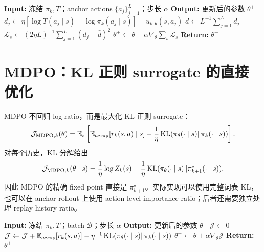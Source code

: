 \begin{algorithm}
\caption{BPO inner update\\{\small\textit{Semantics: 根据当前 student 的中心化 score 重构}}}
\begin{algorithmic}
\STATE \textbf{Input:} 冻结 $\pi_k,T$；anchor actions $\{a_j\}_{j=1}^{L}$；步长 $\alpha$
\STATE \textbf{Output:} 更新后的参数 $\theta^+$
        \STATE $d_j\gets\eta[\log T(a_j\mid s)-\log\pi_k(a_j\mid s)]-u_{k,\theta}(s,a_j)$
    \ENDFOR
    \STATE $\bar d\gets L^{-1}\sum_{j=1}^{L}d_j$
    \STATE $\mathcal L_s\gets(2\eta L)^{-1}\sum_{j=1}^{L}(d_j-\bar d)^2$
\ENDFOR
\STATE $\theta^+\gets\theta-\alpha\nabla_\theta\sum_s\mathcal L_s$
\STATE \textbf{Return:} $\theta^+$
\end{algorithmic}
\end{algorithm}

\section{MDPO：KL 正则 surrogate 的直接优化}
\label{sec:mdpo-unified}

MDPO 不回归 log-ratio，而是最大化 KL 正则 surrogate：
\begin{equation}
\label{eq:mdpo-objective}
 \mathcal J_{\mathrm{MDPO},k}(\theta)
 =\mathbb{E}_{s}\left[
 \mathbb{E}_{a\sim\pi_\theta}[r_k(s,a)\mid s]
 -\frac1\eta\operatorname{KL}(\pi_\theta(\cdot\mid s)\Vert\pi_k(\cdot\mid s))
 \right].
\end{equation}
对每个历史，KL 分解给出
\begin{equation}
\label{eq:mdpo-kl-decomposition}
 \mathcal J_{\mathrm{MDPO},k}(\theta\mid s)
 =\frac1\eta\log Z_k(s)
 -\frac1\eta\operatorname{KL}(\pi_\theta(\cdot\mid s)\Vert\pi_{k+1}^{\star}(\cdot\mid s)).
\end{equation}
因此 MDPO 的精确 fixed point 直接是 $\pi_{k+1}^{\star}$。实际实现可以使用完整词表 KL，也可以在 anchor rollout 上使用 action-level importance ratio；后者还需要独立处理 replay history ratio。

\begin{algorithm}
\caption{MDPO inner update\\{\small\textit{Semantics: 根据 KL 正则 surrogate 重构}}}
\begin{algorithmic}
\STATE \textbf{Input:} 冻结 $\pi_k,T$；batch $\mathcal B$；步长 $\alpha$
\STATE \textbf{Output:} 更新后的参数 $\theta^+$
\STATE $\mathcal J\gets0$
    \STATE $\mathcal J\gets\mathcal J+\mathbb{E}_{a\sim\pi_\theta}[r_k(s,a)]-\eta^{-1}\operatorname{KL}(\pi_\theta(\cdot\mid s)\Vert\pi_k(\cdot\mid s))$
\ENDFOR
\STATE $\theta^+\gets\theta+\alpha\nabla_\theta\mathcal J$
\STATE \textbf{Return:} $\theta^+$
\end{algorithmic}
\end{algorithm}

